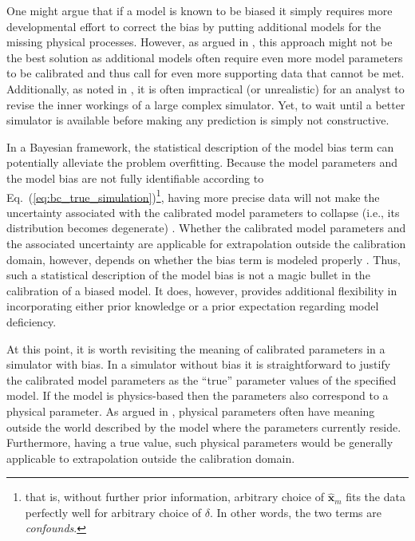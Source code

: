 One might argue that if a model is known to be biased it simply requires more developmental effort to correct the bias by putting additional models for the missing physical processes.
However, as argued in \cite{Arhonditsis2008,Wulff2007}, this approach might not be the best solution as additional models often require even more model parameters to be calibrated and thus call for even more supporting data that cannot be met.
Additionally, as noted in \cite{Campbell2006,Bayarri2007,Brynjarsdottir2014}, it is often impractical (or unrealistic) for an analyst to revise the inner workings of a large complex simulator.
Yet, to wait until a better simulator is available before making any prediction is simply not constructive.

In a Bayesian framework, the statistical description of the model bias term can potentially alleviate the problem overfitting.
Because the model parameters and the model bias are not fully identifiable according to Eq.~(\ref{eq:bc_true_simulation})\footnote{that is, without further prior information, arbitrary choice of $\hat{\bm{x}}_m$ fits the data perfectly well for arbitrary choice of $\delta$. In other words, the two terms are \emph{confounds}.}, 
having more precise data will not make the uncertainty associated with the calibrated model parameters to collapse (i.e., its distribution becomes degenerate) \cite{Bayarri2007,Brynjarsdottir2014}.
Whether the calibrated model parameters and the associated uncertainty are applicable for extrapolation outside the calibration domain, however, depends on whether the bias term is modeled properly \cite{Bayarri2007,Arhonditsis2008,Arendt2012,OHagan2013,Brynjarsdottir2014,Ling2014}.
Thus, such a statistical description of the model bias is not a magic bullet in the calibration of a biased model.
It does, however, provides additional flexibility in incorporating either prior knowledge or a prior expectation regarding model deficiency.

At this point, it is worth revisiting the meaning of calibrated parameters in a simulator with bias.
In a simulator without bias it is straightforward to justify the calibrated model parameters as the ``true'' parameter values of the specified model.
If the model is physics-based then the parameters also correspond to a physical parameter.
As argued in \cite{OHagan2013,Brynjarsdottir2014}, physical parameters often have meaning outside the world described by the model where the parameters currently reside.
Furthermore, having a true value, such physical parameters would be generally applicable to extrapolation outside the calibration domain.

